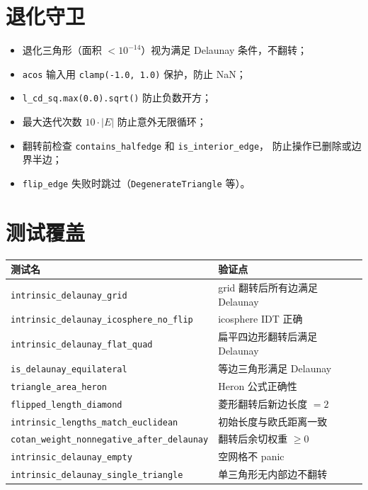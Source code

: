 \documentclass[11pt,a4paper]{article}
\begin{document}
\section{退化守卫}

\begin{itemize}
  \item 退化三角形（面积 $< 10^{-14}$）视为满足 Delaunay 条件，不翻转；
  \item \texttt{acos} 输入用 \texttt{clamp(-1.0, 1.0)} 保护，防止 NaN；
  \item \texttt{l\_cd\_sq.max(0.0).sqrt()} 防止负数开方；
  \item 最大迭代次数 $10 \cdot |E|$ 防止意外无限循环；
  \item 翻转前检查 \texttt{contains\_halfedge} 和 \texttt{is\_interior\_edge}，
        防止操作已删除或边界半边；
  \item \texttt{flip\_edge} 失败时跳过（\texttt{DegenerateTriangle} 等）。
\end{itemize}

\section{测试覆盖}

\begin{center}
\renewcommand{\arraystretch}{1.18}
\begin{tabular}{@{}ll@{}}
  \toprule
  \textbf{测试名} & \textbf{验证点} \\
  \midrule
  \texttt{intrinsic\_delaunay\_grid} & grid 翻转后所有边满足 Delaunay \\
  \texttt{intrinsic\_delaunay\_icosphere\_no\_flip} & icosphere IDT 正确 \\
  \texttt{intrinsic\_delaunay\_flat\_quad} & 扁平四边形翻转后满足 Delaunay \\
  \texttt{is\_delaunay\_equilateral} & 等边三角形满足 Delaunay \\
  \texttt{triangle\_area\_heron} & Heron 公式正确性 \\
  \texttt{flipped\_length\_diamond} & 菱形翻转后新边长度 $= 2$ \\
  \texttt{intrinsic\_lengths\_match\_euclidean} & 初始长度与欧氏距离一致 \\
  \texttt{cotan\_weight\_nonnegative\_after\_delaunay} & 翻转后余切权重 $\geq 0$ \\
  \texttt{intrinsic\_delaunay\_empty} & 空网格不 panic \\
  \texttt{intrinsic\_delaunay\_single\_triangle} & 单三角形无内部边不翻转 \\
  \bottomrule
\end{tabular}
\end{center}
\end{document}
